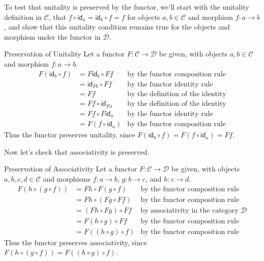 \documentclass[12pt]{article}
\begin{document}
To test that unitality is preserved by the functor, we'll start with the unitality definition in $\mathcal{C}$, that $f\circ \mathsf{id}_a=\mathsf{id}_b\circ f=f$ for objects $a,b\in\mathcal{C}$ and morphism $f:a \rightarrow b$, and show that this unitality condition remains true for the objects and morphism under the functor in $\mathcal{D}$.
\begin{proofbox}{Preservation of Unitality}{}
    Let a functor $F:\mathcal{C} \rightarrow \mathcal{D}$ be given, with objects $a,b\in\mathcal{C}$ and morphism $f:a \rightarrow b$.
    \begin{align*}
        F(\mathsf{id}_b \circ f) & = F\mathsf{id}_b \circ Ff   & \text{by the functor composition rule}   \\
                                 & = \mathsf{id}_{Fb} \circ Ff & \text{by the functor identity rule}      \\
                                 & = Ff                        & \text{by the definition of the identity} \\
                                 & = Ff \circ \mathsf{id}_{Fa} & \text{by the definition of the identity} \\
                                 & = Ff \circ F\mathsf{id}_a   & \text{by the functor identity rule}      \\
                                 & = F(f \circ \mathsf{id}_a)  & \text{by the functor composition rule}
    \end{align*}
    Thus the functor preserves unitality, since $F(\mathsf{id}_b \circ f) = F(f \circ \mathsf{id}_a) = Ff$.
\end{proofbox}
Now let's check that associativity is preserved.
\begin{proofbox}{Preservation of Associativity}{}
    Let a functor $F:\mathcal{C} \rightarrow \mathcal{D}$ be given, with objects $a,b,c,d\in\mathcal{C}$ and morphisms $f:a \rightarrow b$, $g:b \rightarrow c$, and $h:c \rightarrow d$.
    \begin{align*}
        F(h \circ (g \circ f)) & = Fh \circ F(g \circ f)  & \text{by the functor composition rule}                \\
                               & = Fh \circ (Fg \circ Ff) & \text{by the functor composition rule}                \\
                               & = (Fh \circ Fg) \circ Ff & \text{by associativity in the category $\mathcal{D}$} \\
                               & = F(h \circ g) \circ Ff  & \text{by the functor composition rule}                \\
                               & = F((h \circ g) \circ f) & \text{by the functor composition rule}
    \end{align*}
    Thus the functor preserves associativity, since $F(h \circ (g \circ f)) = F((h \circ g) \circ f)$.
\end{proofbox}
\end{document}
